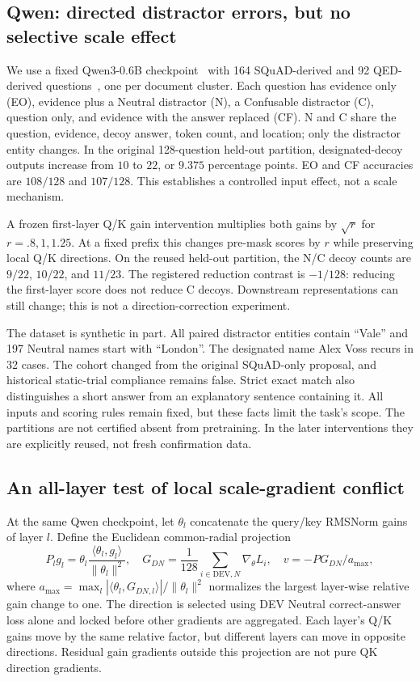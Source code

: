 \documentclass[10pt,a4paper]{article}
\newcommand{\norm}[1]{\lVert#1\rVert}
\begin{document}
\subsection{Qwen: directed distractor errors, but no selective scale effect}
We use a fixed Qwen3-0.6B checkpoint~\cite{qwen} with 164 SQuAD-derived and 92 QED-derived questions~\cite{rajpurkar2016,qed2021}, one per document cluster. Each question has evidence only (EO), evidence plus a Neutral distractor (N), a Confusable distractor (C), question only, and evidence with the answer replaced (CF). N and C share the question, evidence, decoy answer, token count, and location; only the distractor entity changes. In the original 128-question held-out partition, designated-decoy outputs increase from $10$ to $22$, or $9.375$ percentage points. EO and CF accuracies are $108/128$ and $107/128$. This establishes a controlled input effect, not a scale mechanism.

A frozen first-layer Q/K gain intervention multiplies both gains by $\sqrt r$ for $r=.8,1,1.25$. At a fixed prefix this changes pre-mask scores by $r$ while preserving local Q/K directions. On the reused held-out partition, the N/C decoy counts are $9/22$, $10/22$, and $11/23$. The registered reduction contrast is $-1/128$: reducing the first-layer score does not reduce C decoys. Downstream representations can still change; this is not a direction-correction experiment.

The dataset is synthetic in part. All paired distractor entities contain ``Vale'' and 197 Neutral names start with ``London''. The designated name Alex Voss recurs in 32 cases. The cohort changed from the original SQuAD-only proposal, and historical static-trial compliance remains false. Strict exact match also distinguishes a short answer from an explanatory sentence containing it. All inputs and scoring rules remain fixed, but these facts limit the task's scope. The partitions are not certified absent from pretraining. In the later interventions they are explicitly reused, not fresh confirmation data.

\subsection{An all-layer test of local scale-gradient conflict}\label{sec:p15}
At the same Qwen checkpoint, let $\theta_l$ concatenate the query/key RMSNorm gains of layer $l$. Define the Euclidean common-radial projection
\begin{equation}
P_lg_l=\theta_l\frac{\langle\theta_l,g_l\rangle}{\norm{\theta_l}^2},\quad
G_{DN}=\frac1{128}\sum_{i\in\mathrm{DEV},N}\nabla_\theta L_i,\quad
v=-PG_{DN}/a_{\max},
\label{eq:proj}
\end{equation}
where $a_{\max}=\max_l|\langle\theta_l,G_{DN,l}\rangle|/\norm{\theta_l}^2$ normalizes the largest layer-wise relative gain change to one. The direction is selected using DEV Neutral correct-answer loss alone and locked before other gradients are aggregated. Each layer's Q/K gains move by the same relative factor, but different layers can move in opposite directions. Residual gain gradients outside this projection are not pure QK direction gradients.
\end{document}
